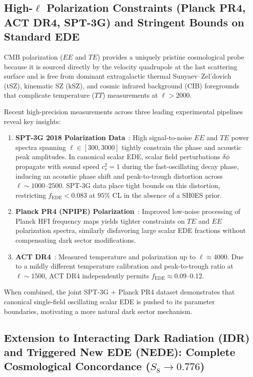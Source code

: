 \documentclass[11pt,a4paper]{article}
\theoremstyle{definition}
\begin{document}
\subsection{High-$\ell$ Polarization Constraints (Planck PR4, ACT DR4, SPT-3G) and Stringent Bounds on Standard EDE}

CMB polarization ($EE$ and $TE$) provides a uniquely pristine cosmological probe because it is sourced directly by the velocity quadrupole at the last scattering surface and is free from dominant extragalactic thermal Sunyaev--Zel'dovich (tSZ), kinematic SZ (kSZ), and cosmic infrared background (CIB) foregrounds that complicate temperature ($TT$) measurements at $\ell > 2000$.

Recent high-precision measurements across three leading experimental pipelines reveal key insights:
\begin{enumerate}
    \item \textbf{SPT-3G 2018 Polarization Data}~\cite{Dutcher2021,Balkenhol2023}: High signal-to-noise $EE$ and $TE$ power spectra spanning $\ell \in [300, 3000]$ tightly constrain the phase and acoustic peak amplitudes. In canonical scalar EDE, scalar field perturbations $\delta\phi$ propagate with sound speed $c_s^2 = 1$ during the fast-oscillating decay phase, inducing an acoustic phase shift and peak-to-trough distortion across $\ell \sim 1000\text{--}2500$. SPT-3G data place tight bounds on this distortion, restricting $f_{\mathrm{EDE}} < 0.083$ at $95\%$ CL in the absence of a SH0ES prior.
    \item \textbf{Planck PR4 (NPIPE) Polarization}~\cite{Tristram2024}: Improved low-noise processing of Planck HFI frequency maps yields tighter constraints on $TE$ and $EE$ polarization spectra, similarly disfavoring large scalar EDE fractions without compensating dark sector modifications.
    \item \textbf{ACT DR4}~\cite{Aiola2020,Hill2022}: Measured temperature and polarization up to $\ell \approx 4000$. Due to a mildly different temperature calibration and peak-to-trough ratio at $\ell \sim 1500$, ACT DR4 independently permits $f_{\mathrm{EDE}} \approx 0.09\text{--}0.12$.
\end{enumerate}

When combined, the joint SPT-3G + Planck PR4 dataset demonstrates that canonical single-field oscillating scalar EDE is pushed to its parameter boundaries, motivating a more natural dark sector mechanism.

\subsection{Extension to Interacting Dark Radiation (IDR) and Triggered New EDE (NEDE): Complete Cosmological Concordance ($S_8 \to 0.776$)}
\end{document}
